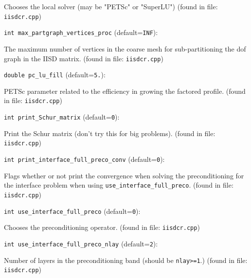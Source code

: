 Chooses the local solver (may be "PETSc" or "SuperLU")
 (found in file: \verb+iisdcr.cpp+)
\item\verb+int max_partgraph_vertices_proc+ {\rm(default=\verb|INF|)}:

The maximum number of vertices in the coarse mesh for
sub-partitioning the dof graph in the IISD matrix. 
 (found in file: \verb+iisdcr.cpp+)
\item\verb+double pc_lu_fill+ {\rm(default=\verb|5.|)}:

PETSc parameter related to the efficiency in growing
  the factored profile.
 (found in file: \verb+iisdcr.cpp+)
\item\verb+int print_Schur_matrix+ {\rm(default=\verb|0|)}:

Print the Schur matrix (don't try this for big problems).
 (found in file: \verb+iisdcr.cpp+)
\item\verb+int print_interface_full_preco_conv+ {\rm(default=\verb|0|)}:

Flags whether or not print the convergence when solving the
preconditioning for the interface problem when using
\verb+use_interface_full_preco+.
 (found in file: \verb+iisdcr.cpp+)
\item\verb+int use_interface_full_preco+ {\rm(default=\verb|0|)}:

Chooses the preconditioning operator. 
 (found in file: \verb+iisdcr.cpp+)
\item\verb+int use_interface_full_preco_nlay+ {\rm(default=\verb|2|)}:

Number of layers in the preconditioning band (should
 be \verb+nlay>=1+.) 
 (found in file: \verb+iisdcr.cpp+)

